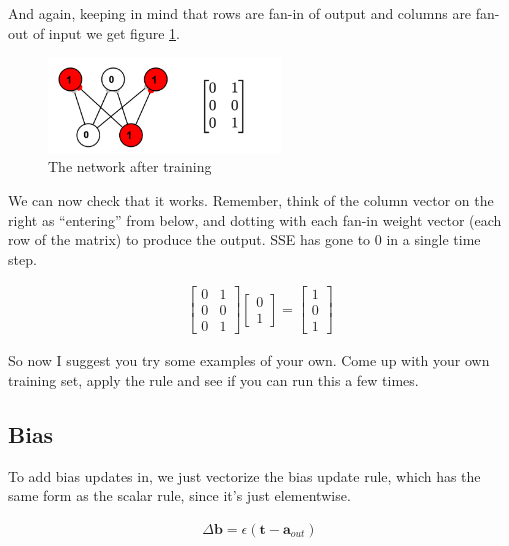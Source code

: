 And again, keeping in mind that rows are fan-in of output and columns are fan-out of input we get figure \ref{lms_vector_2}.

\begin{figure}[h]
\centering
\includegraphics[width=0.55\textwidth]{images/vectorLMSAfterTrain.png}
\caption[Jeff Yoshimi.]{The network after training}
\label{lms_vector_2}
\end{figure}

We can now check that it works. Remember, think of the column vector on the right as ``entering'' from below, and dotting with each fan-in weight vector (each row of the matrix) to produce the output. SSE has gone to 0 in a single time step.

\begin{align*}
\begin{bmatrix} 0 & 1 \\ 0 & 0 \\  0  & 1  \end{bmatrix}
\begin{bmatrix} 0 \\ 1 \end{bmatrix}
= \begin{bmatrix} 1 \\ 0 \\ 1  \end{bmatrix}
\end{align*}

So now I suggest you try some examples of your own. Come up with your own training set, apply the rule and see if you can run this a few times. 

\subsection{Bias}

To add bias updates in, we just vectorize the bias update rule, which has the same form as the scalar rule, since it's just elementwise.

\begin{eqnarray*}
\Delta \mathbf{b}  =  \epsilon (\mathbf{t} - \mathbf{a}_{out})
\end{eqnarray*}


